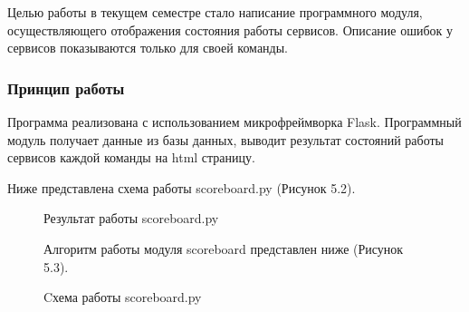 Целью работы в текущем семестре стало написание программного модуля, осуществляющего отображения состояния работы сервисов. Описание ошибок у сервисов показываются только для своей команды.

\subsubsection{Принцип работы}

Программа реализована с использованием микрофреймворка Flask. Программный модуль получает данные из базы данных, выводит результат состояний работы сервисов каждой команды на html страницу.

Ниже представлена схема работы scoreboard.py (Рисунок 5.2).

\begin{figure}[ht!]
\caption{Результат работы scoreboard.py}
\end{figure}

\begin{figure}[ht!]
Алгоритм работы модуля scoreboard представлен ниже (Рисунок 5.3).
\caption{Cхема работы scoreboard.py}
\end{figure}


\clearpage